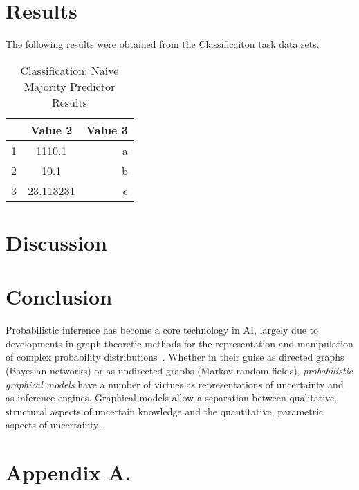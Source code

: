 \documentclass[twoside,11pt]{article}
\begin{document}
\newpage

\section{Results}
The following results were obtained from the Classificaiton task data sets.\newline

\begin{table}[h!]
	\begin{center}
		\caption{Classification: Naive Majority Predictor Results}
		\label{tab:table1}
		\begin{tabular}{l|c|r} 
			\textbf{} & 
			\textbf{Value 2} & 
			\textbf{Value 3}\\
			\hline
			1 & 1110.1 & a\\
			2 & 10.1 & b\\
			3 & 23.113231 & c\\
		\end{tabular}
	\end{center}
\end{table}

\newpage

\section{Discussion}

\newpage

\section{Conclusion}

\newpage

Probabilistic inference has become a core technology in AI,
largely due to developments in graph-theoretic methods for the 
representation and manipulation of complex probability 
distributions~\citep{pearl:88}.  Whether in their guise as 
directed graphs (Bayesian networks) or as undirected graphs (Markov 
random fields), \emph{probabilistic graphical models} have a number 
of virtues as representations of uncertainty and as inference engines.  
Graphical models allow a separation between qualitative, structural
aspects of uncertain knowledge and the quantitative, parametric aspects 
of uncertainty...\\



\newpage

\appendix
\section*{Appendix A.}
\label{app:theorem}
\end{document}
